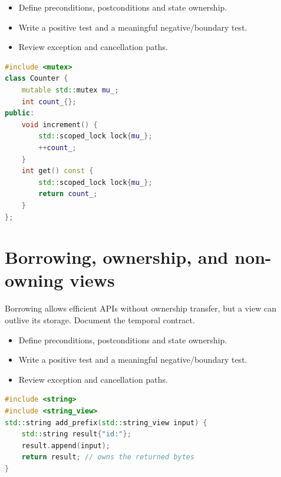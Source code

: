 \documentclass[11pt]{article}
\begin{document}
\begin{itemize}[leftmargin=*,itemsep=1pt,topsep=3pt]
\item Define preconditions, postconditions and state ownership.
\item Write a positive test and a meaningful negative/boundary test.
\item Review exception and cancellation paths.
\end{itemize}
\begin{lstlisting}[language=C++]
#include <mutex>
class Counter {
    mutable std::mutex mu_;
    int count_{};
public:
    void increment() {
        std::scoped_lock lock{mu_};
        ++count_;
    }
    int get() const {
        std::scoped_lock lock{mu_};
        return count_;
    }
};
\end{lstlisting}
\section{Borrowing, ownership, and non-owning views}
Borrowing allows efficient APIs without ownership transfer, but a view can outlive its storage. Document the temporal contract.

\begin{itemize}[leftmargin=*,itemsep=1pt,topsep=3pt]
\item Define preconditions, postconditions and state ownership.
\item Write a positive test and a meaningful negative/boundary test.
\item Review exception and cancellation paths.
\end{itemize}
\begin{lstlisting}[language=C++]
#include <string>
#include <string_view>
std::string add_prefix(std::string_view input) {
    std::string result{"id:"};
    result.append(input);
    return result; // owns the returned bytes
}
\end{lstlisting}
\end{document}
